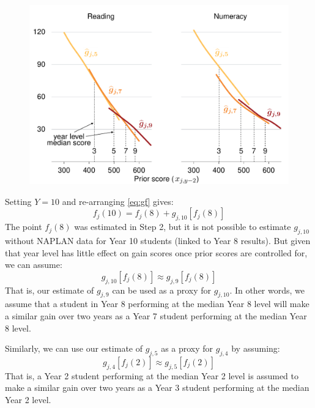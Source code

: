 \begin{figure}[t]
 \includegraphics[width=\columnwidth]{atlas/G579.pdf}\label{fig:g579}

\end{figure}

Setting $Y=10$ and re-arranging \cref{eq:gf} gives:
\begin{equation}
f_{j}\left(10\right) = f_{j}\left(8\right) + g_{j,10}\left[f_{j}\left(8\right)\right]
\end{equation}
The point $f_{j}\left(8\right)$ was estimated in Step 2, but it is not possible to estimate $g_{j,10}$ without NAPLAN data for Year 10 students (linked to Year 8 results). But given that year level has little effect on gain scores once prior scores are controlled for, we can assume:
\begin{equation}
g_{j,10}\left[f_{j}\left(8\right)\right] \approx g_{j,9}\left[f_{j}\left(8\right)\right] \label{eq:g9g10}
\end{equation}
That is, our estimate of $g_{j,9}$ can be used as a proxy for $g_{j,10}$. In other words, we assume that a student in Year 8 performing at the median Year 8 level will make a similar gain over two years as a Year 7 student performing at the median Year 8 level.

Similarly, we can use our estimate of $g_{j,5}$ as a proxy for $g_{j,4}$ by assuming:
\begin{equation}
g_{j,4}\left[f_{j}\left(2\right)\right] \approx g_{j,5}\left[f_{j}\left(2\right)\right] \label{eq:g4g5}
\end{equation}
That is, a Year 2 student performing at the median Year 2 level is assumed to make a similar gain over two years as a Year 3 student performing at the median Year 2 level.

